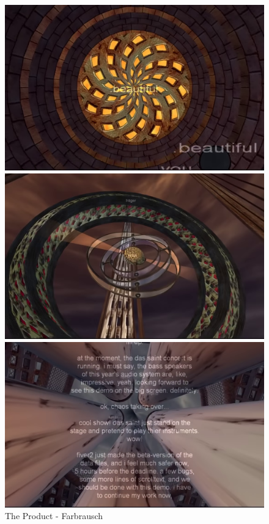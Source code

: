 \begin{figure}[h]
  \begin{minipage}[b]{0.30\linewidth}
    \centering
    \includegraphics[width=\linewidth]{images/demoscene/demos/prod1.png}
  \end{minipage}
  \hfill
  \begin{minipage}[b]{0.30\linewidth}
    \centering
    \includegraphics[width=\linewidth]{images/demoscene/demos/prod2.png}
  \end{minipage}
  \hfill
  \begin{minipage}[b]{0.30\linewidth}
    \centering
    \includegraphics[width=\linewidth]{images/demoscene/demos/prod3.png}
  \end{minipage}
  \caption{The Product - Farbrausch}
  \label{product}
\end{figure}


